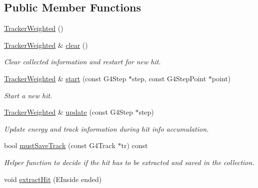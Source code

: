 \subsection*{Public Member Functions}
\begin{DoxyCompactItemize}
\item 
\hyperlink{struct_d_d4hep_1_1_simulation_1_1_tracker_weighted_ae628c5cfae79d839a0640338ba31a6ad}{TrackerWeighted} ()
\item 
\hyperlink{struct_d_d4hep_1_1_simulation_1_1_tracker_weighted}{TrackerWeighted} \& \hyperlink{struct_d_d4hep_1_1_simulation_1_1_tracker_weighted_a0c6304d5c3a6b0964f7388c3440235db}{clear} ()
\begin{DoxyCompactList}\small\item\em Clear collected information and restart for new hit. \item\end{DoxyCompactList}\item 
\hyperlink{struct_d_d4hep_1_1_simulation_1_1_tracker_weighted}{TrackerWeighted} \& \hyperlink{struct_d_d4hep_1_1_simulation_1_1_tracker_weighted_abb50962377c010e8430400035d5e3dcf}{start} (const G4Step $\ast$step, const G4StepPoint $\ast$point)
\begin{DoxyCompactList}\small\item\em Start a new hit. \item\end{DoxyCompactList}\item 
\hyperlink{struct_d_d4hep_1_1_simulation_1_1_tracker_weighted}{TrackerWeighted} \& \hyperlink{struct_d_d4hep_1_1_simulation_1_1_tracker_weighted_a8ffc0941260d20698a82015cd39cf744}{update} (const G4Step $\ast$step)
\begin{DoxyCompactList}\small\item\em Update energy and track information during hit info accumulation. \item\end{DoxyCompactList}\item 
bool \hyperlink{struct_d_d4hep_1_1_simulation_1_1_tracker_weighted_add13493ece4035deef171e3528c25b56}{mustSaveTrack} (const G4Track $\ast$tr) const 
\begin{DoxyCompactList}\small\item\em Helper function to decide if the hit has to be extracted and saved in the collection. \item\end{DoxyCompactList}\item 
void \hyperlink{struct_d_d4hep_1_1_simulation_1_1_tracker_weighted_a8299b772daa5da7c49399a40c1de172d}{extractHit} (EInside ended)

\end{DoxyCompactItemize}

